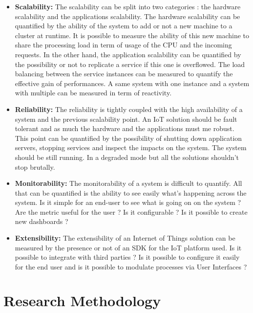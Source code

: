 \documentclass[11pt]{article}
\begin{document}
\begin{itemize}
	\item \textbf{Scalability:} The scalability can be split into two categories : the hardware scalability and the applications scalability. The hardware scalability can be quantified by the ability of the system to add or not a new machine to a cluster at runtime. It is possible to measure the ability of this new machine to share the processing load in term of usage of the CPU and the incoming requests. In the other hand, the application scalability can be quantified by the possibility or not to replicate a service if this one is overflowed. The load balancing between the service instances can be measured to quantify the effective gain of performances. A same system with one instance and a system with multiple can be measured in term of reactivity. 
	
	\item \textbf{Reliability:} The reliability is tightly coupled with the high availability of a system and the previous scalability point. An IoT solution should be fault tolerant and as much the hardware and the applications must me robust. This point can be quantified by the possibility of shutting down application servers, stopping services and inspect the impacts on the system. The system should be still running. In a degraded mode but all the solutions shouldn't stop brutally.

	\item \textbf{Monitorability:} The monitorability of a system is difficult to quantify. All that can be quantified is the ability to see easily what's happening across the system. Is it simple for an end-user to see what is going on on the system ? Are the metric useful for the user ? Is it configurable ? Is it possible to create new dashboards ?

	\item \textbf{Extensibility:} The extensibility of an Internet of Things solution can be measured by the presence or not of an SDK for the IoT platform used. Is it possible to integrate with third parties ? Is it possible to configure it easily for the end user and is it possible to modulate processes via User Interfaces ? 
	
\end{itemize}

\newpage


\section{Research Methodology} \label{research-methodology}



\newpage
\listoffigures
\nocite{*}
\printbibliography
\end{document}
